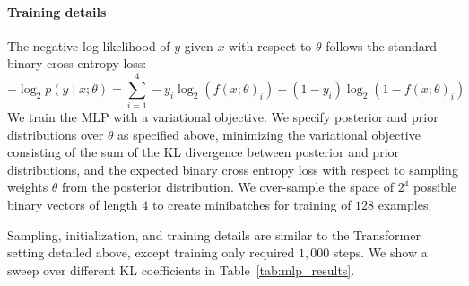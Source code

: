 \paragraph{Training details} The negative log-likelihood of $y$ given $x$ with respect to $\theta$ follows the standard binary cross-entropy loss:
\begin{equation}
    -\log_2 p(y \mid x;\theta) = \sum_{i=1}^4 -y_i \log_2(f(x;\theta)_i) - (1 - y_i) \log_2(1 - f(x;\theta)_i)
\end{equation}
We train the MLP with a variational objective. We specify posterior and prior distributions over $\theta$ as specified above, minimizing the variational objective consisting of the sum of the KL divergence between posterior and prior  distributions, and the expected binary cross entropy loss with respect to sampling weights $\theta$ from the posterior distribution.
We over-sample the space of $2^4$ possible binary vectors of length $4$ to create minibatches for training of $128$ examples.

Sampling, initialization, and training details are similar to the Transformer setting detailed above, except training only required $1,000$ steps. We show a sweep over different KL coefficients in Table~\ref{tab:mlp_results}. 
